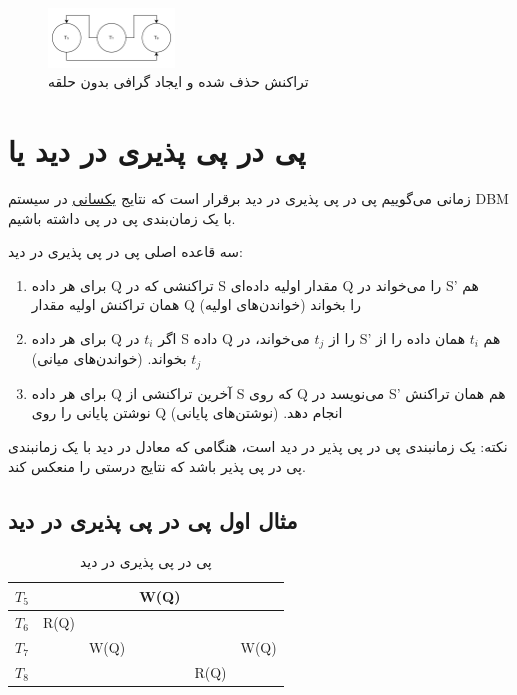 \documentclass[a4paper]{article}
\begin{document}
\begin{figure}
    \centering
    \includegraphics[width=0.3\textwidth]{umls/exp1_solved.jpg}
    \caption{تراکنش حذف شده و ایجاد گرافی بدون حلقه}
    \label{fig: diagram}
\end{figure}

\section{پی در پی پذیری در دید یا }

زمانی می‌گوییم پی در پی پذیری در دید برقرار است که نتایج \underline{یکسانی} در
سیستم DBM با یک زمان‌بندی پی در پی داشته باشیم.

سه قاعده اصلی پی در پی پذیری در دید:

\begin{enumerate}
    \item برای هر داده Q تراکنشی که در S مقدار اولیه داده‌ای Q  را می‌خواند در
    S' هم همان تراکنش اولیه مقدار Q را بخواند (خواندن‌های اولیه)
    \item برای هر داده‌ Q اگر $t_{i}$ در S داده‌ Q را از $t_{j}$ می‌خواند، در S'
    هم $t_{i}$ همان داده‌ را از $t_{j}$ بخواند. (خواندن‌های میانی)
    \item برای هر داده Q آخرین تراکنشی از S که روی Q می‌نویسد در S' هم همان
    تراکنش نوشتن پایانی را روی Q انجام دهد. (نوشتن‌های پایانی)
\end{enumerate}

نکته: یک زمانبندی پی در پی پذیر در دید است، هنگامی که معادل در دید با یک
زمانبندی پی در پی پذیر باشد که نتایج درستی را منعکس کند.

\subsection{مثال اول پی در پی پذیری در دید}

\begin{LTR}
    \begin{table}[h]
        \centering
        \begin{RTL}
            \caption{پی در پی پذیری در دید}
        \end{RTL}
        \begin{tabular}{c|c|c|c|c|c}
            $T_{5}$ & & & W(Q) & & \\ \hline
            $T_{6}$ & R(Q) & & & &  \\ \hline
            $T_{7}$ & & W(Q) & & & W(Q) \\ \hline
            $T_{8}$ & & & & R(Q) & \\
        \end{tabular}
    \end{table}
\end{LTR}
\end{document}
